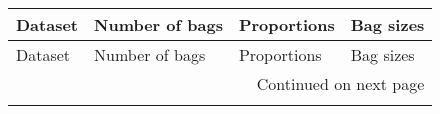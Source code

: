 \begin{longtable}{llll}
\toprule
                                                                                Dataset & Number of bags &                                                  Proportions &                                                    Bag sizes \\
\midrule
\endfirsthead

\toprule
                                                                                Dataset & Number of bags &                                                  Proportions &                                                    Bag sizes \\
\midrule
\endhead
\midrule
\multicolumn{4}{r}{{Continued on next page}} \\
\midrule
\endfoot


\end{longtable}
